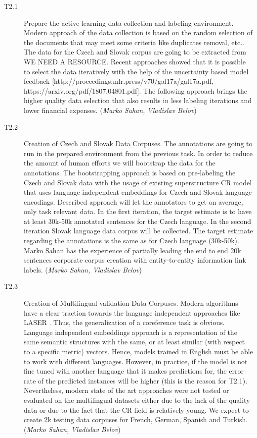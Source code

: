 \begin{description}
	\item [T2.1] Prepare the active learning data collection and labeling environment.
Modern approach of the data collection is based on the random selection of the documents that may meet some criteria like duplicates removal, etc.. The data for the Czech and Slovak corpus are going to be extracted from {\color{red} WE NEED A RESOURCE}. Recent approaches showed that it is possible to select the data iteratively with the help of the uncertainty based model feedback [http://proceedings.mlr.press/v70/gal17a/gal17a.pdf, https://arxiv.org/pdf/1807.04801.pdf]. The following approach brings the higher quality data selection that also results in less labeling iterations and lower financial expenses. (\textit{Marko Sahan, Vladislav Belov})
	\item [T2.2] Creation of Czech and Slovak Data Corpuses. The annotations are going to run in the prepared environment from the previous task. In order to reduce the amount of human efforts we will bootstrap the data for the annotations. The bootstrapping approach is based on pre-labeling the Czech and Slovak data with the usage of existing superstructure CR model that uses language independent embeddings for Czech and Slovak language encodings. Described approach will let the annotators to get on average, only task relevant data.
In the first iteration, the target estimate is to have at least 30k-50k annotated sentences for the Czech language. In the second iteration Slovak language data corpus will be collected. The target estimate regarding the annotations is the same as for Czech language (30k-50k). Marko Sahan has the experience of partially leading the end to end 20k sentences corporate corpus creation with entity-to-entity information link labels.  (\textit{Marko Sahan, Vladislav Belov})
	\item [T2.3] Creation of Multilingual validation Data Corpuses. 
Modern algorithms have a clear traction towards the language independent approaches like LASER \cite{artetxe2019massively}. Thus, the generalization of a coreference task is obvious. Language independent embeddings approach is a representation of the same semantic structures with the same, or at least similar (with respect to a specific metric) vectors. Hence, models trained in English must be able to work with different languages. However, in practice, if the model is not fine tuned with another language that it makes predictions for, the error rate of the predicted instances will be higher (this is the reason for T2.1). Nevertheless, modern state of the art approaches were not tested or evaluated on the multilingual datasets either due to the lack of the quality data or due to the fact that the CR field is relatively young. We expect to create 2k testing data corpuses for French, German, Spanish and Turkish. (\textit{Marko Sahan, Vladislav Belov})
\end{description}


